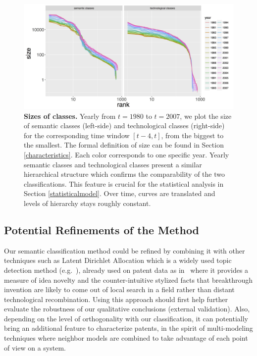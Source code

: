 \documentclass[12pt,twoside,a4paper]{article}
\begin{document}
\begin{figure}
\centering
\hspace*{-2.5cm}
\includegraphics[width=1.2\textwidth]{all_raw_counts.jpg}
\caption{\textbf{Sizes of classes.} Yearly from $t = 1980$ to $t =2007$, we plot the size of semantic classes (left-side) and technological classes (right-side) for the corresponding time window $[t-4, t]$, 
from the biggest to the smallest. The formal definition of size can be found in Section \ref{characteristics}. Each color corresponds to one specific year. Yearly semantic classes and technological classes present a similar hierarchical structure which confirms the comparability of the two classifications. This feature is crucial for the statistical analysis in Section \ref{statisticalmodel}. Over time, curves are translated and levels of hierarchy stays roughly constant.}
\label{fig:class-sizes}
\end{figure}



\subsection{Potential Refinements of the Method}

Our semantic classification method could be refined by combining it with other techniques such as Latent Dirichlet Allocation which is a widely used topic detection method (e.g.~\cite{blei2003latent}), already used on patent data as in~\cite{kaplan2015double} where it provides a measure of idea novelty and the counter-intuitive stylized facts that breakthrough invention are likely to come out of local search in a field rather than distant technological recombination. Using this approach should first help further evaluate the robustness of our qualitative conclusions (external validation). Also, depending on the level of orthogonality with our classification, it can potentially bring an additional feature to characterize patents, in the spirit of multi-modeling techniques where neighbor models are combined to take advantage of each point of view on a system.
\end{document}
